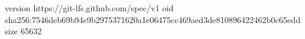 version https://git-lfs.github.com/spec/v1
oid sha256:7546deb69b94e9b2975371620a1e06475cc469aed3de810896422462b0c65edd
size 65632
